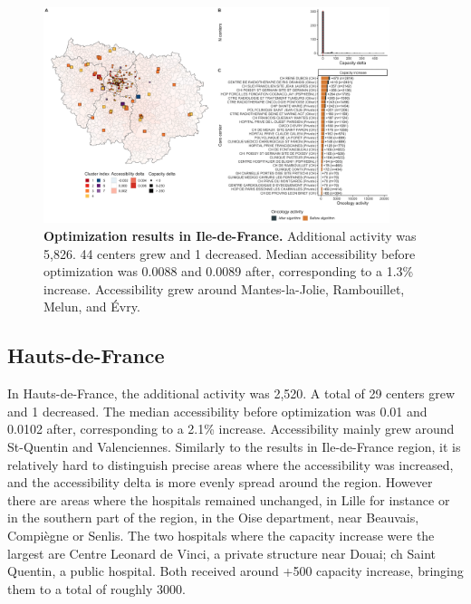 \begin{figure}[H]
    \includegraphics[width=0.9\textwidth]{images/camion/optim_region/optim_Ile-de-France.png}
    \centering
    \caption{ \textbf{Optimization results in Ile-de-France.} Additional
        activity was 5,826. 44 centers grew and 1 decreased. Median
        accessibility before optimization was 0.0088 and 0.0089 after,
        corresponding to a 1.3\% increase. Accessibility grew around
        Mantes-la-Jolie, Rambouillet, Melun, and Évry. }
\end{figure}

\subsection*{Hauts-de-France}

In Hauts-de-France, the additional activity was 2,520. A total of 29 centers
grew and 1 decreased. The median accessibility before optimization was 0.01 and
0.0102 after, corresponding to a 2.1\% increase. Accessibility mainly grew
around St-Quentin and Valenciennes. Similarly to the results in Ile-de-France
region, it is relatively hard to distinguish precise areas where the accessibility
was increased, and the accessibility delta is more evenly spread around the region.
However there are areas where the hospitals remained unchanged, in Lille for instance or
in the southern part of the region, in the Oise department, near Beauvais,
Compiègne or Senlis. The two hospitals where the capacity increase were the
largest are Centre Leonard de Vinci, a private structure near Douai; \ac{ch}
Saint Quentin, a public hospital. Both received around +500 capacity increase,
bringing them to a total of roughly 3000.

